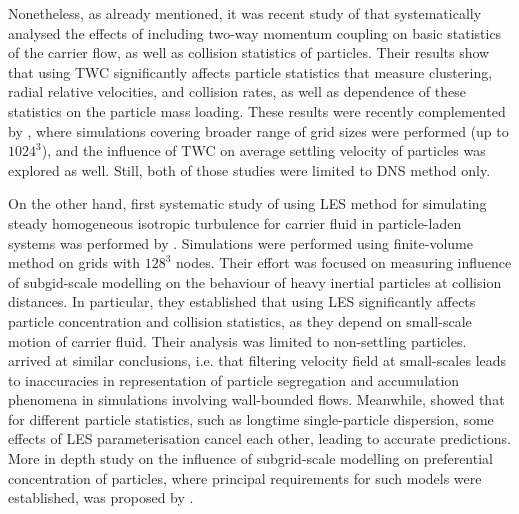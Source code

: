 \documentclass{pracamgren}
\begin{document}
Nonetheless, as already mentioned, it was recent study of \textcite{Rosa2020} that systematically analysed the effects of including two-way momentum coupling on basic statistics of the carrier flow, as well as collision statistics of particles.
Their results show that using TWC significantly affects particle statistics that measure clustering, radial relative velocities, and collision rates, as well as dependence of these statistics on the particle mass loading.
These results were recently complemented by \textcite{Rosa2022}, where simulations covering broader range of grid sizes were performed (up to $1024^3$), and the influence of TWC on average settling velocity of particles was explored as well. 
Still, both of those studies were limited to DNS method only.

On the other hand, first systematic study of using LES method for simulating steady homogeneous isotropic turbulence for carrier fluid in particle-laden systems was performed by \textcite{Fede2006}.
Simulations were performed using finite-volume method on grids with $128^3$ nodes.
Their effort was focused on measuring influence of subgid-scale modelling on the behaviour of heavy inertial particles at collision distances.
In particular, they established that using LES significantly affects particle concentration and collision statistics, as they depend on small-scale motion of carrier fluid.
Their analysis was limited to non-settling particles.
\textcite{Marchioli2008} arrived at similar conclusions, i.e. that filtering velocity field at small-scales leads to inaccuracies in representation of particle segregation and accumulation phenomena in simulations involving wall-bounded flows.
Meanwhile, \textcite{Yang2008} showed that for different particle statistics, such as longtime single-particle dispersion, some effects of LES parameterisation cancel each other, leading to accurate predictions.
More in depth study on the influence of subgrid-scale modelling on preferential concentration of particles, where principal requirements for such models were established, was proposed by \textcite{Pozorski2009}.
\end{document}
